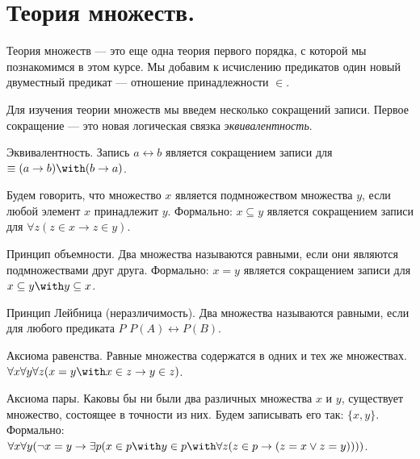 \section{Теория множеств.}

Теория множеств --- это еще одна теория первого порядка, с которой
мы познакомимся в этом курсе.
Мы добавим к исчислению предикатов один новый двуместный предикат --- отношение 
принадлежности $\in$. 

Для изучения теории множеств мы введем несколько сокращений записи.
Первое сокращение --- это новая логическая связка \emph{эквивалентность}. 

\begin{definition}{Эквивалентность.}
Запись $a \leftrightarrow b$ является сокращением записи для 
$ \equiv ( a \rightarrow b) \with (b \rightarrow a)$.
\end{definition}

\begin{definition}Будем говорить, что множество $x$ является подмножеством
множества $y$, если любой элемент $x$ принадлежит $y$. 
Формально: $x \subseteq y$ является сокращением записи для
$\forall z (z \in x \rightarrow z \in y)$.
\end{definition}

\begin{definition}{Принцип объемности.}
Два множества называются равными, если они являются подмножествами друг друга. Формально:
$x = y$ является сокращением записи для $x \subseteq y \with y \subseteq x$.
\end{definition}

\begin{definition}{Принцип Лейбница (неразличимость).}
Два множества называются равными, если для любого предиката $P$ $P(A) \leftrightarrow P(B)$.
\end{definition}

\begin{axiom}{Аксиома равенства.}
Равные множества содержатся в одних и тех же множествах. 
$\forall x \forall y \forall z (x = y \with x \in z \rightarrow y \in z)$.
\end{axiom}

\begin{axiom}{Аксиома пары.}
Каковы бы ни были два различных множества $x$ и $y$, существует множество, состоящее 
в точности из них. Будем записывать его так: $\{x,y\}$.
Формально: 
$\forall x \forall y (\neg x=y \rightarrow \exists p (x \in p \with y \in p \with \forall z (z \in p \rightarrow (z = x \vee z = y))))$.
\end{axiom}

